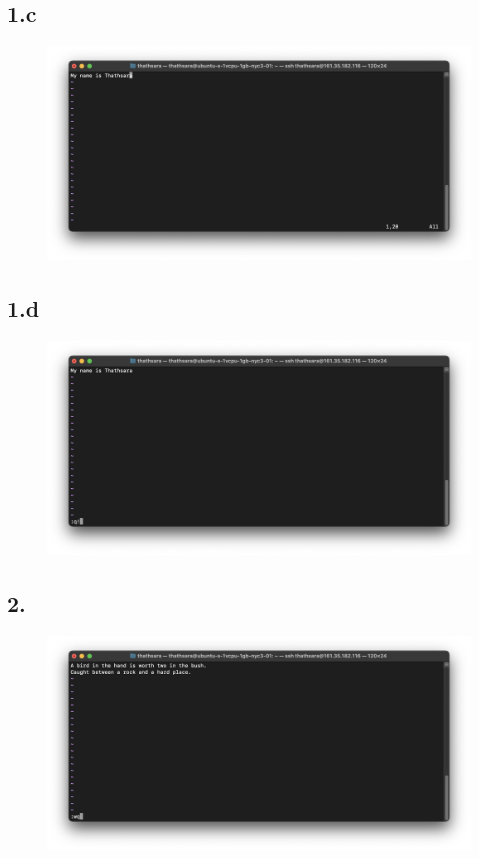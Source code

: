 \documentclass{article}
\begin{document}
    \subsection*{1.c}
    \begin{figure}[H]
        \centering
        \includegraphics[width=\textwidth]{1/1_c.png}
    \end{figure}

    \subsection*{1.d}
    \begin{figure}[H]
        \centering
        \includegraphics[width=\textwidth]{1/1_d.png}
    \end{figure}

    \subsection*{2.}
    \begin{figure}[H]
        \centering
        \includegraphics[width=\textwidth]{1/2.png}
    \end{figure}
\end{document}
